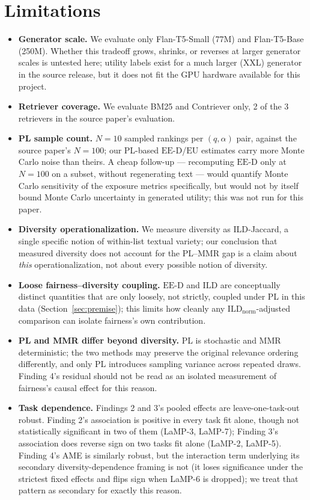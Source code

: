 \documentclass[11pt]{article}
\newcommand{\eed}{\ensuremath{\mathrm{EE\text{-}D}}}
\newcommand{\eu}{\ensuremath{\mathrm{EU}}}
\newcommand{\ild}{\ensuremath{\mathrm{ILD}}}
\newcommand{\ildnorm}{\ensuremath{\ild_{\mathrm{norm}}}}
\begin{document}
\section{Limitations}
\label{sec:limitations}

\begin{itemize}
\item \textbf{Generator scale.} We evaluate only Flan-T5-Small (77M) and
  Flan-T5-Base (250M). Whether this tradeoff grows, shrinks, or reverses
  at larger generator scales is untested here; utility labels exist for a
  much larger (XXL) generator in the source release, but it does not fit
  the GPU hardware available for this project.
\item \textbf{Retriever coverage.} We evaluate BM25 and Contriever only,
  2 of the 3 retrievers in the source paper's evaluation.
\item \textbf{PL sample count.} $N=10$ sampled rankings per $(q,\alpha)$
  pair, against the source paper's $N=100$; our PL-based \eed{}/\eu{}
  estimates carry more Monte Carlo noise than theirs. A cheap follow-up
  --- recomputing \eed{} only at $N=100$ on a subset, without regenerating
  text --- would quantify Monte Carlo sensitivity of the exposure metrics
  specifically, but would not by itself bound Monte Carlo uncertainty in
  generated utility; this was not run for this paper.
\item \textbf{Diversity operationalization.} We measure diversity as
  ILD-Jaccard, a single specific notion of within-list textual variety;
  our conclusion that measured diversity does not account for the
  PL--MMR gap is a claim about \emph{this} operationalization, not about
  every possible notion of diversity.
\item \textbf{Loose fairness--diversity coupling.} \eed{} and \ild{} are
  conceptually distinct quantities that are only loosely, not strictly,
  coupled under PL in this data (Section~\ref{sec:premise}); this limits
  how cleanly any \ildnorm{}-adjusted comparison can isolate fairness's
  own contribution.
\item \textbf{PL and MMR differ beyond diversity.} PL is stochastic and
  MMR deterministic; the two methods may preserve the original relevance
  ordering differently, and only PL introduces sampling variance across
  repeated draws. Finding 4's residual should not be read as an isolated
  measurement of fairness's causal effect for this reason.
\item \textbf{Task dependence.} Findings 2 and 3's pooled effects are
  leave-one-task-out robust. Finding 2's association is positive in every
  task fit alone, though not statistically significant in two of them
  (LaMP-3, LaMP-7); Finding 3's association does reverse sign on two
  tasks fit alone (LaMP-2, LaMP-5). Finding 4's AME is similarly robust,
  but the interaction term underlying its secondary
  diversity-dependence framing is not (it loses significance under the
  strictest fixed effects and flips sign when LaMP-6 is dropped); we
  treat that pattern as secondary for exactly this reason.
\end{itemize}
\end{document}
